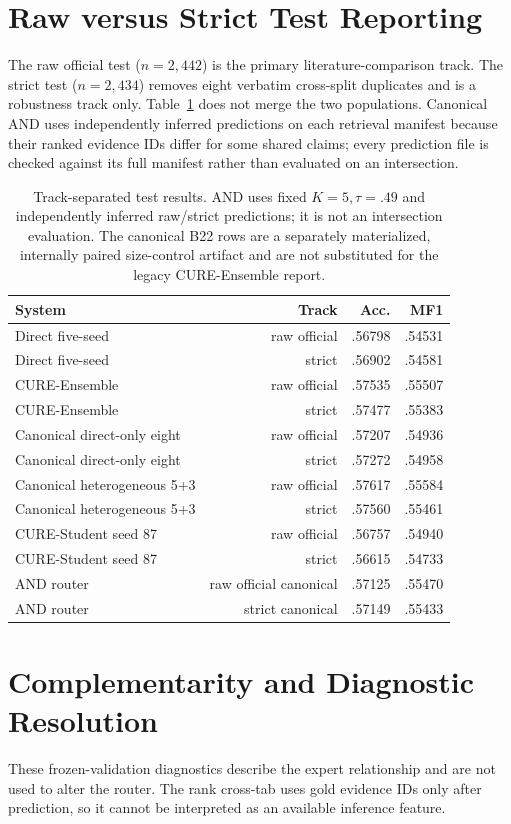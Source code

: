 \documentclass[11pt]{article}
\begin{document}
\section{Raw versus Strict Test Reporting}
The raw official test ($n=2{,}442$) is the primary literature-comparison track. The strict test ($n=2{,}434$) removes eight verbatim cross-split duplicates and is a robustness track only. Table~\ref{tab:raw-strict} does not merge the two populations. Canonical AND uses independently inferred predictions on each retrieval manifest because their ranked evidence IDs differ for some shared claims; every prediction file is checked against its full manifest rather than evaluated on an intersection.

\begin{table}[t]
\centering\scriptsize
\begin{tabular}{@{}lrrr@{}}
\toprule
System & Track & Acc. & MF1\\
\midrule
Direct five-seed & raw official & .56798 & .54531\\
Direct five-seed & strict & .56902 & .54581\\
CURE-Ensemble & raw official & .57535 & .55507\\
CURE-Ensemble & strict & .57477 & .55383\\
Canonical direct-only eight & raw official & .57207 & .54936\\
Canonical direct-only eight & strict & .57272 & .54958\\
Canonical heterogeneous 5+3 & raw official & .57617 & .55584\\
Canonical heterogeneous 5+3 & strict & .57560 & .55461\\
CURE-Student seed 87 & raw official & .56757 & .54940\\
CURE-Student seed 87 & strict & .56615 & .54733\\
AND router & raw official canonical & .57125 & .55470\\
AND router & strict canonical & .57149 & .55433\\
\bottomrule
\end{tabular}
\caption{Track-separated test results. AND uses fixed $K=5,\tau=.49$ and independently inferred raw/strict predictions; it is not an intersection evaluation. The canonical B22 rows are a separately materialized, internally paired size-control artifact and are not substituted for the legacy CURE-Ensemble report.}\label{tab:raw-strict}
\end{table}

\section{Complementarity and Diagnostic Resolution}\label{app:complementarity}
These frozen-validation diagnostics describe the expert relationship and are not used to alter the router. The rank cross-tab uses gold evidence IDs only after prediction, so it cannot be interpreted as an available inference feature.
\end{document}
